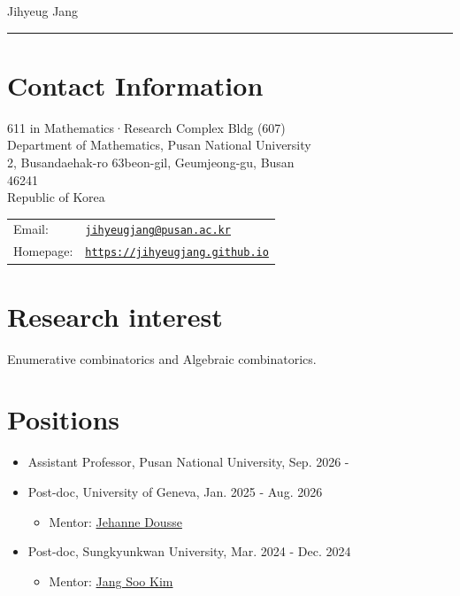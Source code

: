 \documentclass[letterpaper]{article}
\def\name{Jihyeug Jang}
\begin{document}
{\huge \name}


\vspace{0.2in}

\noindent\rule{\textwidth}{1pt}

\section*{Contact Information}
\begin{minipage}{0.55\linewidth}
  611 in Mathematics·Research Complex Bldg (607) \\
  Department of Mathematics, Pusan National University \\
  2, Busandaehak-ro 63beon-gil, Geumjeong-gu, Busan \\
  46241 \\
  Republic of Korea
\end{minipage}
\begin{minipage}{0.35\linewidth}
  \begin{tabular}{ll}
    Email: & \href{mailto:jihyeugjang@pusan.ac.kr}{\tt jihyeugjang@pusan.ac.kr} \\
    Homepage: & \href{https://jihyeugjang.github.io}{\tt https://jihyeugjang.github.io} \\
  \end{tabular}
\end{minipage}


\section*{Research interest}

Enumerative combinatorics and Algebraic combinatorics.

\section*{Positions}
\begin{itemize}
\item Assistant Professor, Pusan National University, Sep. 2026 - 
\item Post-doc, University of Geneva, Jan. 2025 - Aug. 2026
    \begin{itemize}
    \item Mentor: \href{https://www.unige.ch/~doussej/}{Jehanne Dousse}
    \end{itemize}
\item Post-doc, Sungkyunkwan University, Mar. 2024 - Dec. 2024
    \begin{itemize}
    \item Mentor: \href{https://jangsookim.github.io/}{Jang Soo Kim}
    \end{itemize}
\end{itemize}
\end{document}
